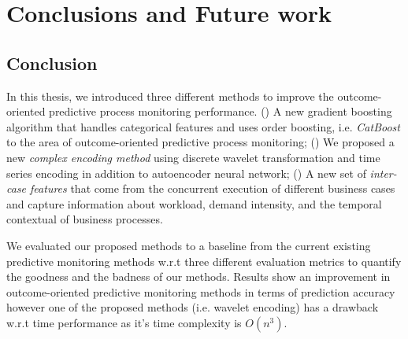 
\chapter{Conclusions and Future work} \label{ch6} %



\ifpdf
    \graphicspath{{X/figures/PNG/}{X/figures/PDF/}{X/figures/}}
\else
    \graphicspath{{X/figures/EPS/}{X/figures/}}
\fi

\section{Conclusion} 
In this thesis, we introduced three different methods to improve the outcome-oriented predictive process monitoring performance. () A new gradient boosting algorithm that handles categorical features and uses order boosting, i.e. \textit{CatBoost} to the area of outcome-oriented predictive process monitoring; () We proposed a new \textit{complex encoding method} using discrete wavelet transformation and time series encoding in addition to autoencoder neural network; () A new set of \textit{inter-case features} that come from the concurrent execution of different business cases and capture information about workload, demand intensity, and the temporal contextual of business processes. 

We evaluated our proposed methods to a baseline from the current existing predictive monitoring methods w.r.t three different evaluation metrics to quantify the goodness and the badness of our methods.  Results show an improvement in outcome-oriented predictive monitoring methods in terms of prediction accuracy however one of the proposed methods (i.e. wavelet encoding) has a drawback w.r.t time performance as it's time complexity is $O(n^3)$. 

